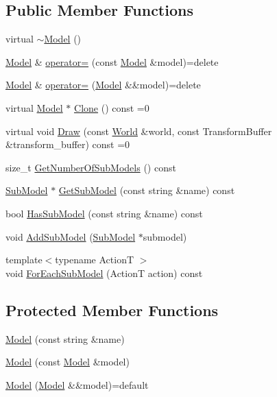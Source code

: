 \subsection*{Public Member Functions}
\begin{DoxyCompactItemize}
\item 
virtual \hyperlink{classmage_1_1_model_af9f45ed2dcf470f85bbfd144ca9857a7}{$\sim$\+Model} ()
\item 
\hyperlink{classmage_1_1_model}{Model} \& \hyperlink{classmage_1_1_model_a563515c64ec39cfcda9f6ca37576391b}{operator=} (const \hyperlink{classmage_1_1_model}{Model} \&model)=delete
\item 
\hyperlink{classmage_1_1_model}{Model} \& \hyperlink{classmage_1_1_model_a084e30d15822bfefa79128f30a57cc02}{operator=} (\hyperlink{classmage_1_1_model}{Model} \&\&model)=delete
\item 
virtual \hyperlink{classmage_1_1_model}{Model} $\ast$ \hyperlink{classmage_1_1_model_ae5e9bee52da0db8c7a29920c13ed40ea}{Clone} () const =0
\item 
virtual void \hyperlink{classmage_1_1_model_a766c89cdac2e3df748cd73f8ed8bbff5}{Draw} (const \hyperlink{classmage_1_1_world}{World} \&world, const Transform\+Buffer \&transform\+\_\+buffer) const =0
\item 
size\+\_\+t \hyperlink{classmage_1_1_model_a29ad2496b11ef5af5f179cfe52943cd3}{Get\+Number\+Of\+Sub\+Models} () const
\item 
\hyperlink{classmage_1_1_sub_model}{Sub\+Model} $\ast$ \hyperlink{classmage_1_1_model_a1cae9eb62a353445d14b5331e88bdeac}{Get\+Sub\+Model} (const string \&name) const
\item 
bool \hyperlink{classmage_1_1_model_a319fb9b9d9c673ed9c83325d5bcbdfd7}{Has\+Sub\+Model} (const string \&name) const
\item 
void \hyperlink{classmage_1_1_model_abf3f207329b5d4482e515e206e856295}{Add\+Sub\+Model} (\hyperlink{classmage_1_1_sub_model}{Sub\+Model} $\ast$submodel)
\item 
{\footnotesize template$<$typename ActionT $>$ }\\void \hyperlink{classmage_1_1_model_ab50233128bb52002a11f3195b846c830}{For\+Each\+Sub\+Model} (ActionT action) const
\end{DoxyCompactItemize}
\subsection*{Protected Member Functions}
\begin{DoxyCompactItemize}
\item 
\hyperlink{classmage_1_1_model_adc37cc2030a93cde5da20f9a941c060e}{Model} (const string \&name)
\item 
\hyperlink{classmage_1_1_model_ac5f1d340bbfefd30bec3e6343a86059a}{Model} (const \hyperlink{classmage_1_1_model}{Model} \&model)
\item 
\hyperlink{classmage_1_1_model_a085272d7cb82587094f18747ecc5aad0}{Model} (\hyperlink{classmage_1_1_model}{Model} \&\&model)=default
\end{DoxyCompactItemize}
